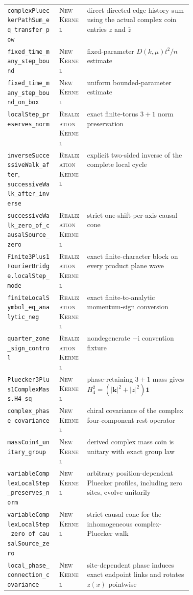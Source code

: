\documentclass[11pt]{article}
\newcommand{\Kernel}{\textcolor{kernelcolor}{\textsc{Kernel}}}
\newcommand{\NewResult}{\textsc{New}}
\newcommand{\Realization}{\textsc{Realization}}
\newcommand{\ii}{\mathrm{i}}
\newcommand{\id}{\mathbf{1}}
\begin{document}
\begin{center}
\begin{tabularx}{\linewidth}{@{}p{0.29\linewidth}p{0.15\linewidth}X@{}}
\texttt{complexPlueckerPathSum\_eq\_transfer\_pow}
 & \NewResult{} \Kernel{} & direct directed-edge history sum using the actual complex coin entries $z$ and $\bar z$\\
\texttt{fixed\_time\_many\_step\_bound}
 & \NewResult{} \Kernel{} & fixed-parameter $D(k,\mu)t^2/n$ estimate\\
\texttt{fixed\_time\_many\_step\_bound\_on\_box}
 & \NewResult{} \Kernel{} & uniform bounded-parameter estimate\\
\texttt{localStep\_preserves\_norm}
 & \Realization{} \Kernel{} & exact finite-torus $3+1$ norm preservation\\
\texttt{inverseSuccessiveWalk\_after}, \texttt{successiveWalk\_after\_inverse}
 & \Realization{} \Kernel{} & explicit two-sided inverse of the complete local cycle\\
\texttt{successiveWalk\_zero\_of\_causalSource\_zero}
 & \Realization{} \Kernel{} & strict one-shift-per-axis causal cone\\
\texttt{Finite3Plus1FourierBridge.localStep\_mode}
 & \Realization{} \Kernel{} & exact finite-character block on every product plane wave\\
\texttt{finiteLocalSymbol\_eq\_analytic\_neg}
 & \Realization{} \Kernel{} & exact finite-to-analytic momentum-sign conversion\\
\texttt{quarter\_zone\_sign\_control}
 & \Realization{} \Kernel{} & nondegenerate $-\ii$ convention fixture\\
\texttt{Pluecker3Plus1ComplexMass.H4\_sq}
 & \NewResult{} \Kernel{} & phase-retaining $3+1$ mass gives $H_4^2=(|\mathbf k|^2+|z|^2)\id$\\
\texttt{complex\_phase\_covariance}
 & \NewResult{} \Kernel{} & chiral covariance of the complex four-component rest operator\\
\texttt{massCoin4\_unitary\_group}
 & \NewResult{} \Kernel{} & derived complex mass coin is unitary with exact group law\\
\texttt{variableComplexLocalStep\_preserves\_norm}
 & \NewResult{} \Kernel{} & arbitrary position-dependent Pluecker profiles, including zero sites, evolve unitarily\\
\texttt{variableComplexLocalStep\_zero\_of\_causalSource\_zero}
 & \NewResult{} \Kernel{} & strict causal cone for the inhomogeneous complex-Pluecker walk\\
\texttt{local\_phase\_connection\_covariance}
 & \NewResult{} \Kernel{} & site-dependent phase induces exact endpoint links and rotates $z(x)$ pointwise\\

\end{tabularx}
\end{center}
\end{document}

